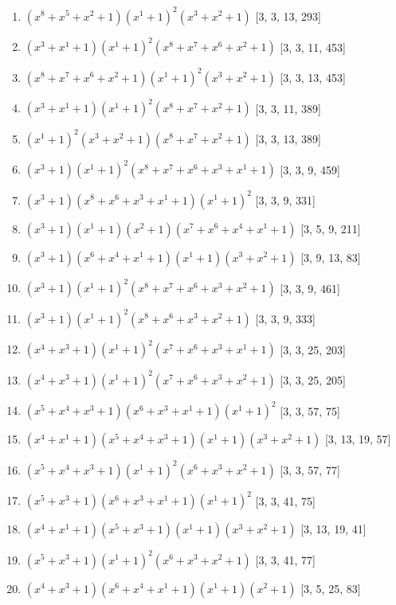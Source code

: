 \documentclass[10pt,twocolumn]{article}
\begin{document}
\begin{enumerate}
\item $(x^{8} + x^{5} + x^{2} + 1)(x^{1} + 1)^{2}(x^{3} + x^{2} + 1)$  [3, 3, 13, 293]
\item $(x^{3} + x^{1} + 1)(x^{1} + 1)^{2}(x^{8} + x^{7} + x^{6} + x^{2} + 1)$  [3, 3, 11, 453]
\item $(x^{8} + x^{7} + x^{6} + x^{2} + 1)(x^{1} + 1)^{2}(x^{3} + x^{2} + 1)$  [3, 3, 13, 453]
\item $(x^{3} + x^{1} + 1)(x^{1} + 1)^{2}(x^{8} + x^{7} + x^{2} + 1)$  [3, 3, 11, 389]
\item $(x^{1} + 1)^{2}(x^{3} + x^{2} + 1)(x^{8} + x^{7} + x^{2} + 1)$  [3, 3, 13, 389]
\item $(x^{3} + 1)(x^{1} + 1)^{2}(x^{8} + x^{7} + x^{6} + x^{3} + x^{1} + 1)$  [3, 3, 9, 459]
\item $(x^{3} + 1)(x^{8} + x^{6} + x^{3} + x^{1} + 1)(x^{1} + 1)^{2}$  [3, 3, 9, 331]
\item $(x^{3} + 1)(x^{1} + 1)(x^{2} + 1)(x^{7} + x^{6} + x^{4} + x^{1} + 1)$  [3, 5, 9, 211]
\item $(x^{3} + 1)(x^{6} + x^{4} + x^{1} + 1)(x^{1} + 1)(x^{3} + x^{2} + 1)$  [3, 9, 13, 83]
\item $(x^{3} + 1)(x^{1} + 1)^{2}(x^{8} + x^{7} + x^{6} + x^{3} + x^{2} + 1)$  [3, 3, 9, 461]
\item $(x^{3} + 1)(x^{1} + 1)^{2}(x^{8} + x^{6} + x^{3} + x^{2} + 1)$  [3, 3, 9, 333]
\item $(x^{4} + x^{3} + 1)(x^{1} + 1)^{2}(x^{7} + x^{6} + x^{3} + x^{1} + 1)$  [3, 3, 25, 203]
\item $(x^{4} + x^{3} + 1)(x^{1} + 1)^{2}(x^{7} + x^{6} + x^{3} + x^{2} + 1)$  [3, 3, 25, 205]
\item $(x^{5} + x^{4} + x^{3} + 1)(x^{6} + x^{3} + x^{1} + 1)(x^{1} + 1)^{2}$  [3, 3, 57, 75]
\item $(x^{4} + x^{1} + 1)(x^{5} + x^{4} + x^{3} + 1)(x^{1} + 1)(x^{3} + x^{2} + 1)$  [3, 13, 19, 57]
\item $(x^{5} + x^{4} + x^{3} + 1)(x^{1} + 1)^{2}(x^{6} + x^{3} + x^{2} + 1)$  [3, 3, 57, 77]
\item $(x^{5} + x^{3} + 1)(x^{6} + x^{3} + x^{1} + 1)(x^{1} + 1)^{2}$  [3, 3, 41, 75]
\item $(x^{4} + x^{1} + 1)(x^{5} + x^{3} + 1)(x^{1} + 1)(x^{3} + x^{2} + 1)$  [3, 13, 19, 41]
\item $(x^{5} + x^{3} + 1)(x^{1} + 1)^{2}(x^{6} + x^{3} + x^{2} + 1)$  [3, 3, 41, 77]
\item $(x^{4} + x^{3} + 1)(x^{6} + x^{4} + x^{1} + 1)(x^{1} + 1)(x^{2} + 1)$  [3, 5, 25, 83]

\end{enumerate}
\end{document}
